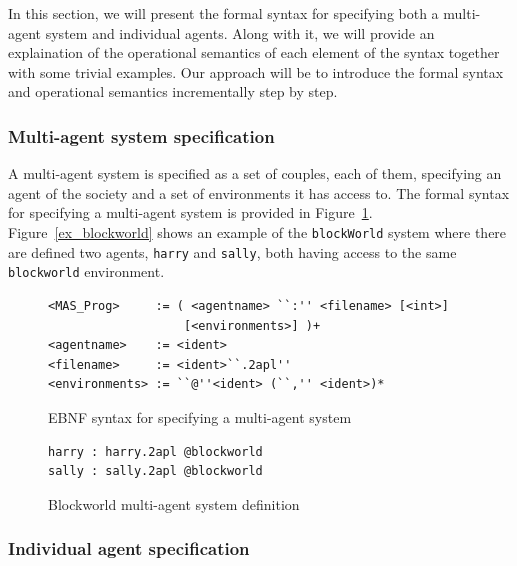 \documentclass[a4paper]{article}
\begin{document}
In this section, we will present the formal syntax for specifying both a multi-agent system and individual agents. Along with it, we will provide an explaination of the operational semantics of each element of the syntax together with some trivial examples. Our approach will be to introduce the formal syntax and operational semantics incrementally step by step.

\subsubsection{Multi-agent system specification} %

A multi-agent system is specified as a set of couples, each of them, specifying an agent of the society and a set of environments it has access to. The formal syntax for specifying a multi-agent system is provided in Figure~\ref{fig:ebnf_mas}. Figure~\ref{ex_blockworld} shows an example of the \texttt{blockWorld} system where there are defined two agents, \texttt{harry} and \texttt{sally}, both having access to the same \texttt{blockworld} environment.

\begin{figure}[htbp]
\begin{verbatim}
<MAS_Prog>     := ( <agentname> ``:'' <filename> [<int>]
                   [<environments>] )+
<agentname>    := <ident>
<filename>     := <ident>``.2apl''
<environments> := ``@''<ident> (``,'' <ident>)*
\end{verbatim}
\caption{EBNF syntax for specifying a multi-agent system}
\label{fig:ebnf_mas}
\end{figure}

\begin{figure}[htbp]
\begin{verbatim}
harry : harry.2apl @blockworld
sally : sally.2apl @blockworld
\end{verbatim}
\caption{Blockworld multi-agent system definition}
\label{fig:ex_blockworld}
\end{figure}

\subsubsection{Individual agent specification} %

% 
\end{document}
